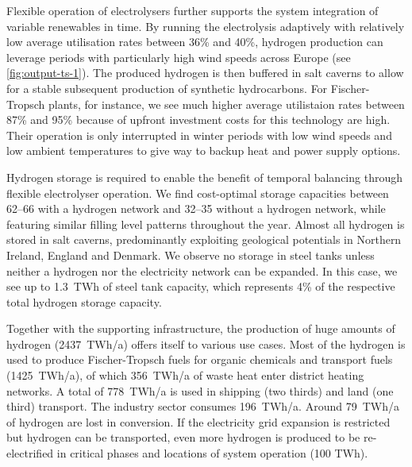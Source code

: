 
Flexible operation of electrolysers further supports the system integration of
variable renewables in time. By running the electrolysis adaptively with
relatively low average utilisation rates between 36\% and 40\%, hydrogen
production can leverage periods with particularly high wind speeds across Europe
(see \cref{fig:output-ts-1}). The produced hydrogen is then buffered in salt
caverns to allow for a stable subsequent production of synthetic hydrocarbons.
For Fischer-Tropsch plants, for instance, we see much higher average utilistaion
rates between 87\% and 95\% because of upfront investment costs for this
technology are high. Their operation is only interrupted in winter periods with
low wind speeds and low ambient temperatures to give way to backup heat and power
supply options.

Hydrogen storage is required to enable the benefit of temporal balancing through
flexible electrolyser operation. We find cost-optimal storage capacities between
\SIrange{62}{66}{\twh} with a hydrogen network and \SIrange{32}{35}{\twh}
without a hydrogen network, while featuring similar filling level patterns
throughout the year. Almost all hydrogen is stored in salt caverns,
predominantly exploiting geological potentials in Northern Ireland, England and
Denmark. We observe no storage in steel tanks unless neither a hydrogen nor the
electricity network can be expanded. In this case, we see up to 1.3~TWh of steel
tank capacity, which represents 4\% of the respective total hydrogen storage
capacity.



Together with the supporting infrastructure, the production of huge amounts of
hydrogen (2437~TWh/a) offers itself to various use cases. Most of the hydrogen
is used to produce Fischer-Tropsch fuels for organic chemicals and transport
fuels (1425~TWh/a), of which 356~TWh/a of waste heat enter district heating
networks. A total of 778~TWh/a is used in shipping (two thirds) and land (one
third) transport. The industry sector consumes 196~TWh/a. Around 79~TWh/a of
hydrogen are lost in conversion. If the electricity grid expansion is restricted
but hydrogen can be transported, even more hydrogen is produced to be
re-electrified in critical phases and locations of system operation (100
TWh\el).


